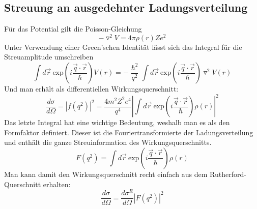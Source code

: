 \documentclass[Ex4_Zusammenfassung.tex]{subfiles}
\begin{document}
\subsection*{Streuung an ausgedehnter Ladungsverteilung}
Für das Potential gilt die Poisson-Gleichung
\begin{equation}
- \triangledown^2 V = 4 \pi \rho(r) Ze^2
\end{equation}
Unter Verwendung einer Green'schen Identität lässt sich das Integral für die Streuamplitude umschreiben 
\begin{equation}
\int d \vec r \  \text{exp} \left(i \frac{ \vec q \cdot \vec r }{\hslash} \right) V(r) = - \frac{\hslash^2}{q^2} \int d \vec r \  \text{exp} \left(i \frac{\vec q \cdot \vec r }{\hslash}\right) \triangledown^2 V(r)
\end{equation}
Und man erhält als differentiellen Wirkungsquerschnitt:
\begin{equation}
\frac{d\sigma}{d\Omega} = |f(q^2)|^2 = \frac{4m^2Z^2e^4}{q^4} \left|\int d \vec r \  \text{exp}\left(i \frac{ \vec q \cdot \vec r }{\hslash} \right) \rho(r)  \right|^2
\end{equation}
Das letzte Integral hat eine wichtige Bedeutung, weshalb man es als den Formfaktor definiert. Dieser ist die Fouriertransformierte der Ladungsverteilung und enthält die ganze Streuinformation des Wirkungsquerschnitts.
\begin{equation}
F(q^2) = \int d \vec r \   \text{exp}\left(i \frac{ \vec q \cdot \vec r }{\hslash} \right) \rho(r)
\end{equation}
Man kann damit den Wirkungsquerschnitt recht einfach aus dem Rutherford-Querschnitt erhalten:
\begin{equation}
\frac{d\sigma}{d\Omega} = \frac{d\sigma^R}{d\Omega} |F(q^2)|^2
\end{equation}
\end{document}

